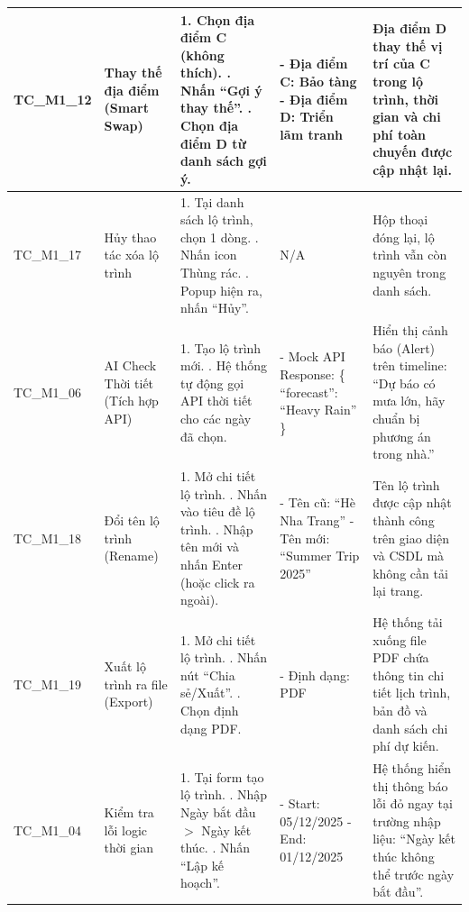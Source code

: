 \begin{landscape}
\begin{longtable}{|p{2.5cm}|p{4.0cm}|p{6.5cm}|p{4.5cm}|p{4.5cm}|}
TC\_M1\_12 & Thay thế địa điểm (Smart Swap) & 
1. Chọn địa điểm C (không thích). \newline 
2. Nhấn ``Gợi ý thay thế''. \newline 
3. Chọn địa điểm D từ danh sách gợi ý. & 
- Địa điểm C: Bảo tàng \newline 
- Địa điểm D: Triển lãm tranh & 
Địa điểm D thay thế vị trí của C trong lộ trình, thời gian và chi phí toàn chuyến được cập nhật lại. \\
\hline

TC\_M1\_17 & Hủy thao tác xóa lộ trình & 
1. Tại danh sách lộ trình, chọn 1 dòng. \newline 
2. Nhấn icon Thùng rác. \newline 
3. Popup hiện ra, nhấn ``Hủy''. & 
N/A & 
Hộp thoại đóng lại, lộ trình vẫn còn nguyên trong danh sách. \\
\hline

TC\_M1\_06 & AI Check Thời tiết (Tích hợp API) & 
1. Tạo lộ trình mới. \newline 
2. Hệ thống tự động gọi API thời tiết cho các ngày đã chọn. & 
- Mock API Response: \{ ``forecast'': ``Heavy Rain'' \} & 
Hiển thị cảnh báo (Alert) trên timeline: ``Dự báo có mưa lớn, hãy chuẩn bị phương án trong nhà.'' \\
\hline

TC\_M1\_18 & Đổi tên lộ trình (Rename) & 
1. Mở chi tiết lộ trình. \newline 
2. Nhấn vào tiêu đề lộ trình. \newline 
3. Nhập tên mới và nhấn Enter (hoặc click ra ngoài). & 
- Tên cũ: ``Hè Nha Trang'' \newline
- Tên mới: ``Summer Trip 2025'' & 
Tên lộ trình được cập nhật thành công trên giao diện và CSDL mà không cần tải lại trang. \\
\hline

TC\_M1\_19 & Xuất lộ trình ra file (Export) & 
1. Mở chi tiết lộ trình. \newline 
2. Nhấn nút ``Chia sẻ/Xuất''. \newline 
3. Chọn định dạng PDF. & 
- Định dạng: PDF & 
Hệ thống tải xuống file PDF chứa thông tin chi tiết lịch trình, bản đồ và danh sách chi phí dự kiến. \\
\hline

TC\_M1\_04 & Kiểm tra lỗi logic thời gian & 
1. Tại form tạo lộ trình. \newline 
2. Nhập Ngày bắt đầu $>$ Ngày kết thúc. \newline 
3. Nhấn ``Lập kế hoạch''. & 
- Start: 05/12/2025 \newline 
- End: 01/12/2025 & 
Hệ thống hiển thị thông báo lỗi đỏ ngay tại trường nhập liệu: ``Ngày kết thúc không thể trước ngày bắt đầu''. \\
\hline


\end{longtable}
\end{landscape}
